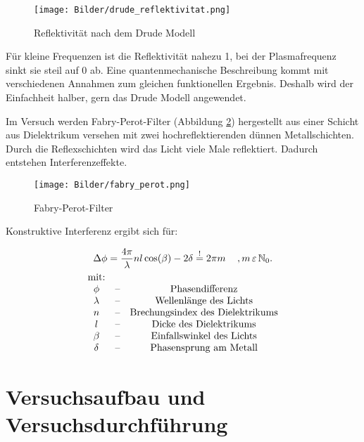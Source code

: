 \documentclass[10pt,twoside]{article}
\renewcommand{\epsilon}{\varepsilon}
\renewcommand{\1}{^{-1}}
\renewcommand{\2}{^{-2}}
\newcommand{\3}{^{-3}}
\newcommand{\4}{^{-4}}
\newcommand{\5}{^{-5}}
\newcommand{\6}{^{-6}}
\newcommand{\7}{^{-7}}
\newcommand{\8}{^{-8}}
\newcommand{\9}{^{-9}}
\begin{document}
\begin{figure}[h]
\centering
\texttt{[image: Bilder/drude\_reflektivitat.png]} 
\caption{Reflektivität nach dem Drude Modell}
\label{fig:drude}
\end{figure}

Für kleine Frequenzen ist die Reflektivität nahezu 1, bei der Plasmafrequenz sinkt sie steil auf 0 ab.
Eine quantenmechanische Beschreibung kommt mit verschiedenen Annahmen zum gleichen funktionellen Ergebnis. Deshalb wird der Einfachheit halber, gern das Drude Modell angewendet.

Im Versuch werden Fabry-Perot-Filter (Abbildung \ref{fig:fabry}) hergestellt aus einer Schicht aus Dielektrikum versehen mit zwei hochreflektierenden dünnen Metallschichten.
Durch die Reflexschichten wird das Licht viele Male reflektiert. Dadurch entstehen Interferenzeffekte.

\begin{figure}[H]
\centering
\texttt{[image: Bilder/fabry\_perot.png]} 
\caption{Fabry-Perot-Filter}
\label{fig:fabry}
\end{figure}

Konstruktive Interferenz ergibt sich für:

\begin{gather}
\Delta \phi = \frac{4 \pi}{\lambda} n l \cos(\beta )- 2 \delta  \overset{!}{=} 2 \pi m \, \, \, \, \,  \, \, , m \,\epsilon \, \mathbb{N}_0. \\ 
\begin{matrix}
   \text{mit:} &&\\
   \phi & \text{--} & \text{Phasendifferenz} \\
   \lambda & \text{--} & \text{Wellenlänge des Lichts} \\
   n & \text{--} & \text{Brechungsindex des Dielektrikums} \\
   l & \text{--} & \text{Dicke des Dielektrikums} \\
   \beta & \text{--} & \text{Einfallswinkel des Lichts} \\
   \delta & \text{--} & \text{Phasensprung am Metall} \\
\end{matrix}\notag
\end{gather}

\section{Versuchsaufbau und Versuchsdurchführung}
\end{document}
